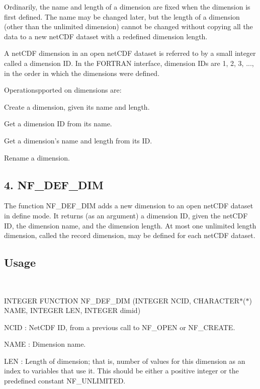 Ordinarily, the name and length of a dimension are fixed when the dimension is first defined. The name may be changed later, but the length of a dimension (other than the unlimited dimension) cannot be changed without copying all the data to a new net\+C\+DF dataset with a redefined dimension length.

A net\+C\+DF dimension in an open net\+C\+DF dataset is referred to by a small integer called a dimension ID. In the F\+O\+R\+T\+R\+AN interface, dimension I\+Ds are 1, 2, 3, ..., in the order in which the dimensions were defined.

Operationspported on dimensions are\+:


\begin{DoxyItemize}
\item Create a dimension, given its name and length.
\item Get a dimension ID from its name.
\item Get a dimension’s name and length from its ID.
\item Rename a dimension.
\end{DoxyItemize}\hypertarget{nc_f77_interface_guide_f77_NF-DEF-DIM}{}\subsection{4. N\+F\+\_\+\+D\+E\+F\+\_\+\+D\+I\+M }\label{nc_f77_interface_guide_f77_NF-DEF-DIM}
The function N\+F\+\_\+\+D\+E\+F\+\_\+\+D\+IM adds a new dimension to an open net\+C\+DF dataset in define mode. It returns (as an argument) a dimension ID, given the net\+C\+DF ID, the dimension name, and the dimension length. At most one unlimited length dimension, called the record dimension, may be defined for each net\+C\+DF dataset.

\subsection*{Usage }

 

I\+N\+T\+E\+G\+ER F\+U\+N\+C\+T\+I\+ON N\+F\+\_\+\+D\+E\+F\+\_\+\+D\+IM (I\+N\+T\+E\+G\+ER N\+C\+ID, C\+H\+A\+R\+A\+C\+T\+E\+R$\ast$($\ast$) N\+A\+ME, I\+N\+T\+E\+G\+ER L\+EN, I\+N\+T\+E\+G\+ER dimid)

{\ttfamily N\+C\+ID} \+: Net\+C\+DF ID, from a previous call to N\+F\+\_\+\+O\+P\+EN or N\+F\+\_\+\+C\+R\+E\+A\+TE.

{\ttfamily N\+A\+ME} \+: Dimension name.

{\ttfamily L\+EN} \+: Length of dimension; that is, number of values for this dimension as an index to variables that use it. This should be either a positive integer or the predefined constant N\+F\+\_\+\+U\+N\+L\+I\+M\+I\+T\+ED.

